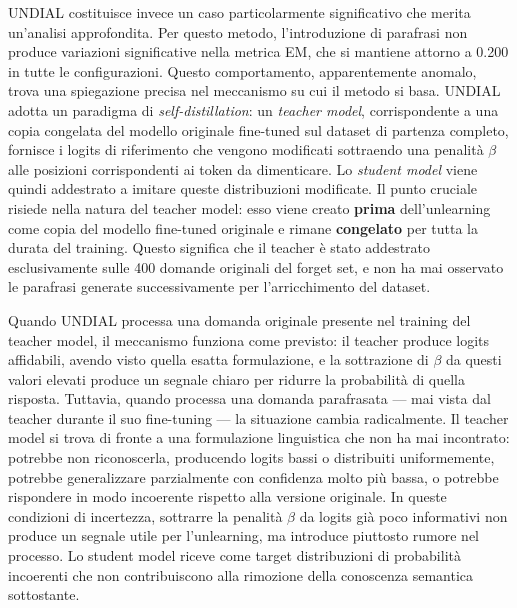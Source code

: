 UNDIAL costituisce invece un caso particolarmente significativo che merita un'analisi approfondita. Per questo metodo, l'introduzione di parafrasi non produce variazioni significative nella metrica EM, che si mantiene attorno a 0.200 in tutte le configurazioni. Questo comportamento, apparentemente anomalo, trova una spiegazione precisa nel meccanismo su cui il metodo si basa. UNDIAL \cite{dong_undial_2024} adotta un paradigma di \emph{self-distillation}: un \emph{teacher model}, corrispondente a una copia congelata del modello originale fine-tuned sul dataset di partenza completo, fornisce i logits di riferimento che vengono modificati sottraendo una penalità $\beta$ alle posizioni corrispondenti ai token da dimenticare. Lo \emph{student model} viene quindi addestrato a imitare queste distribuzioni modificate. Il punto cruciale risiede nella natura del teacher model: esso viene creato \textbf{prima} dell'unlearning come copia del modello fine-tuned originale e rimane \textbf{congelato} per tutta la durata del training. Questo significa che il teacher è stato addestrato esclusivamente sulle 400 domande originali del forget set, e non ha mai osservato le parafrasi generate successivamente per l'arricchimento del dataset.

Quando UNDIAL processa una domanda originale presente nel training del teacher model, il meccanismo funziona come previsto: il teacher produce logits affidabili, avendo visto quella esatta formulazione, e la sottrazione di $\beta$ da questi valori elevati produce un segnale chiaro per ridurre la probabilità di quella risposta. Tuttavia, quando processa una domanda parafrasata — mai vista dal teacher durante il suo fine-tuning — la situazione cambia radicalmente. Il teacher model si trova di fronte a una formulazione linguistica che non ha mai incontrato: potrebbe non riconoscerla, producendo logits bassi o distribuiti uniformemente, potrebbe generalizzare parzialmente con confidenza molto più bassa, o potrebbe rispondere in modo incoerente rispetto alla versione originale. In queste condizioni di incertezza, sottrarre la penalità $\beta$ da logits già poco informativi non produce un segnale utile per l'unlearning, ma introduce piuttosto rumore nel processo. Lo student model riceve come target distribuzioni di probabilità incoerenti che non contribuiscono alla rimozione della conoscenza semantica sottostante.

